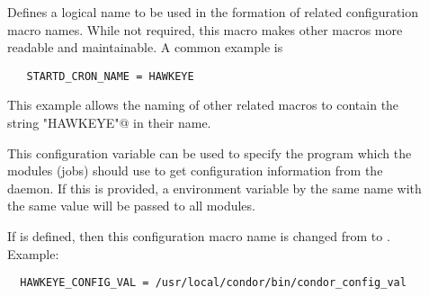 \begin{description}

\item[]
\label{param:StartdCronName}
  Defines a logical name to be used in the formation of related
  configuration macro names. While
  not required, this macro makes other macros
  more readable and maintainable.  A common example is
\begin{verbatim}
   STARTD_CRON_NAME = HAWKEYE
\end{verbatim}
  This example allows the naming of other related macros
  to contain the string \verb@"HAWKEYE"@ in their name.

\item[]
\label{param:StartdCronConfigVal}
  This configuration variable can be used to specify the
   program which the modules (jobs) should use to
  get configuration information from the daemon.  If this is provided,
  a environment variable by the same name with the same value will be
  passed to all modules.

  If 
  is defined, then this configuration macro name is changed from
   to
  .  Example:

\begin{verbatim}
  HAWKEYE_CONFIG_VAL = /usr/local/condor/bin/condor_config_val
\end{verbatim}


\end{description}
